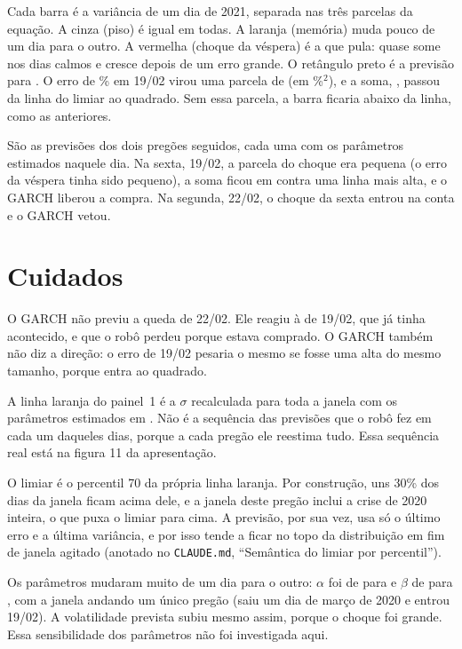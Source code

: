\documentclass[11pt,a4paper]{article}
\begin{document}
\begin{ideia}
Cada barra é a variância de um dia de 2021, separada nas três parcelas da equação. A cinza (piso) é igual em todas. A
laranja (memória) muda pouco de um dia para o outro. A vermelha (choque da véspera) é a que pula: quase some nos dias
calmos e cresce depois de um erro grande. O retângulo preto é a previsão para \vSegDia. O erro de \vSegUltRes\% em 19/02
virou uma parcela de \vSegPAlfa{} (em \%$^2$), e a soma, \vSegVarPrev, passou da linha do limiar ao quadrado. Sem essa
parcela, a barra ficaria abaixo da linha, como as anteriores.
\end{ideia}

\begin{ideia}
São as previsões dos dois pregões seguidos, cada uma com os parâmetros estimados naquele dia. Na sexta, 19/02, a parcela do
choque era pequena (o erro da véspera tinha sido pequeno), a soma ficou em \vSexVarPrev{} contra uma linha mais alta, e o
GARCH liberou a compra. Na segunda, 22/02, o choque da sexta entrou na conta e o GARCH vetou.
\end{ideia}

\section{Cuidados}

\begin{cuidado}
O GARCH não previu a queda de 22/02. Ele reagiu à de 19/02, que já tinha acontecido, e que o robô perdeu porque estava
comprado. O GARCH também não diz a direção: o erro de 19/02 pesaria o mesmo se fosse uma alta do mesmo tamanho, porque entra ao
quadrado.

A linha laranja do painel~1 é a $\sigma$ recalculada para toda a janela com os parâmetros estimados em \vSegDia. Não é a
sequência das previsões que o robô fez em cada um daqueles dias, porque a cada pregão ele reestima tudo. Essa sequência
real está na figura 11 da apresentação.

O limiar é o percentil 70 da própria linha laranja. Por construção, uns 30\% dos dias da janela ficam acima dele, e a
janela deste pregão inclui a crise de 2020 inteira, o que puxa o limiar para cima. A previsão, por sua vez, usa só o
último erro e a última variância, e por isso tende a ficar no topo da distribuição em fim de janela agitado (anotado no
\texttt{CLAUDE.md}, ``Semântica do limiar por percentil'').

Os parâmetros mudaram muito de um dia para o outro: $\alpha$ foi de \vSexAlfa{} para \vSegAlfa{} e $\beta$ de \vSexBeta{}
para \vSegBeta, com a janela andando um único pregão (saiu um dia de março de 2020 e entrou 19/02). A volatilidade
prevista subiu mesmo assim, porque o choque foi grande. Essa sensibilidade dos parâmetros não foi investigada aqui.
\end{cuidado}
\end{document}
